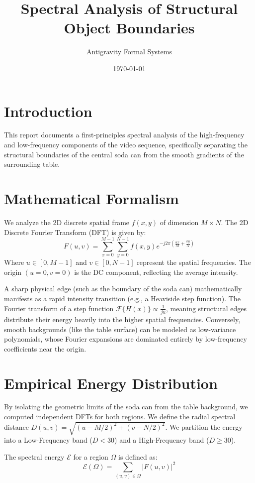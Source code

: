 \documentclass[12pt]{article}
\title{Spectral Analysis of Structural Object Boundaries}
\author{Antigravity Formal Systems}
\date{\today}
\begin{document}
\maketitle

\section{Introduction}
This report documents a first-principles spectral analysis of the high-frequency and low-frequency components of the video sequence, specifically separating the structural boundaries of the central soda can from the smooth gradients of the surrounding table.

\section{Mathematical Formalism}
We analyze the 2D discrete spatial frame $f(x, y)$ of dimension $M \times N$. The 2D Discrete Fourier Transform (DFT) is given by:
\begin{equation}
    F(u, v) = \sum_{x=0}^{M-1} \sum_{y=0}^{N-1} f(x, y) e^{-j2\pi\left(\frac{ux}{M} + \frac{vy}{N}\right)}
\end{equation}
Where $u \in [0, M-1]$ and $v \in [0, N-1]$ represent the spatial frequencies. The origin $(u=0, v=0)$ is the DC component, reflecting the average intensity. 

A sharp physical edge (such as the boundary of the soda can) mathematically manifests as a rapid intensity transition (e.g., a Heaviside step function). The Fourier transform of a step function $\mathcal{F}\{H(x)\} \propto \frac{1}{ju}$, meaning structural edges distribute their energy heavily into the higher spatial frequencies. 
Conversely, smooth backgrounds (like the table surface) can be modeled as low-variance polynomials, whose Fourier expansions are dominated entirely by low-frequency coefficients near the origin.

\section{Empirical Energy Distribution}
By isolating the geometric limits of the soda can from the table background, we computed independent DFTs for both regions. We define the radial spectral distance $D(u,v) = \sqrt{(u - M/2)^2 + (v - N/2)^2}$. We partition the energy into a Low-Frequency band ($D < 30$) and a High-Frequency band ($D \ge 30$).

The spectral energy $\mathcal{E}$ for a region $\Omega$ is defined as:
\begin{equation}
    \mathcal{E}(\Omega) = \sum_{(u,v) \in \Omega} |F(u,v)|^2
\end{equation}
\end{document}
